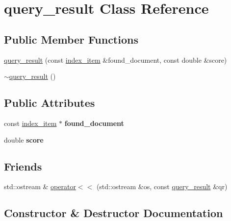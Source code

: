 \hypertarget{classquery__result}{}\section{query\+\_\+result Class Reference}
\label{classquery__result}
\subsection*{Public Member Functions}
\begin{DoxyCompactItemize}
\item 
\hyperlink{classquery__result_a04c9ec02fbb2014f14cc5f49a3fb708a}{query\+\_\+result} (const \hyperlink{classindex__item}{index\+\_\+item} \&found\+\_\+document, const double \&score)
\item 
\hyperlink{classquery__result_a85eee76ed372ad28ab7347053633714a}{$\sim$query\+\_\+result} ()
\end{DoxyCompactItemize}
\subsection*{Public Attributes}
\begin{DoxyCompactItemize}
\item 
\mbox{\label{classquery__result_adeb8f383329e7bfbdeb049ecf526feaa}} 
const \hyperlink{classindex__item}{index\+\_\+item} $\ast$ {\bfseries found\+\_\+document}
\item 
\mbox{\label{classquery__result_aa385d79066a78d6b47d299ba4bf7f6e4}} 
double {\bfseries score}
\end{DoxyCompactItemize}
\subsection*{Friends}
\begin{DoxyCompactItemize}
\item 
std\+::ostream \& \hyperlink{classquery__result_aa97ddcf5d38eaf8c7160b9fe609170f5}{operator$<$$<$} (std\+::ostream \&os, const \hyperlink{classquery__result}{query\+\_\+result} \&qr)
\end{DoxyCompactItemize}


\subsection{Constructor \& Destructor Documentation}
\mbox{\label{classquery__result_a04c9ec02fbb2014f14cc5f49a3fb708a}} 
